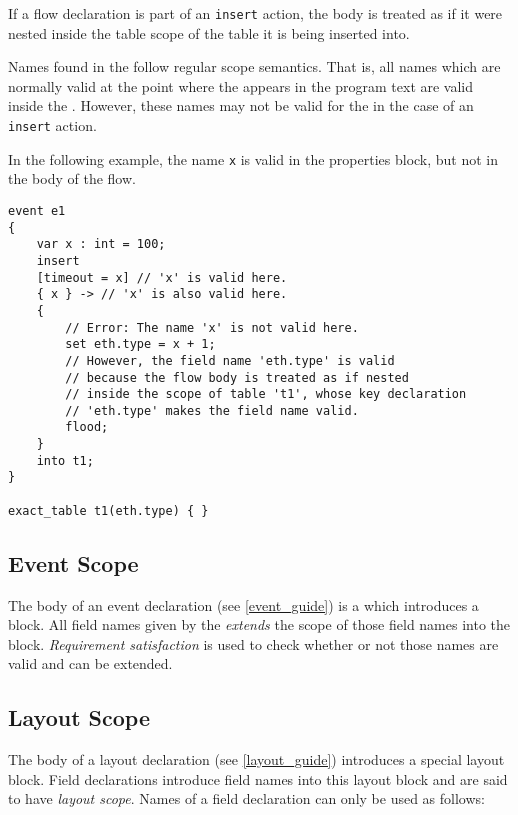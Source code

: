 If a flow declaration is part of an \texttt{insert} action, the body is treated as if it were nested inside the table scope of the table it is being inserted into. 

Names found in the  follow regular scope semantics. That is, all names which are normally valid at the point where the  appears in the program text are valid inside the . However, these names may not be valid for the  in the case of an \texttt{insert} action.

In the following example, the name \texttt{x} is valid in the properties block, but not in the body of the flow.

\noindent\begin{minipage}{\linewidth}
\begin{lstlisting}
event e1 
{
	var x : int = 100;
	insert
	[timeout = x] // 'x' is valid here.
	{ x } -> // 'x' is also valid here. 
	{
		// Error: The name 'x' is not valid here.
		set eth.type = x + 1; 
		// However, the field name 'eth.type' is valid
		// because the flow body is treated as if nested
		// inside the scope of table 't1', whose key declaration
		// 'eth.type' makes the field name valid.
		flood; 
	}
	into t1;
}

exact_table t1(eth.type) { }
\end{lstlisting}
\end{minipage}

\subsection{Event Scope} \label{event_scope}

The body of an event declaration (see \ref{event_guide}) is a  which introduces a block. All field names given by the  \textit{extends} the scope of those field names into the block. \textit{Requirement satisfaction} is used to check whether or not those names are valid and can be extended.

\subsection{Layout Scope} \label{layout_scope}

The body of a layout declaration (see \ref{layout_guide}) introduces a special layout block. Field declarations introduce field names into this layout block and are said to have \textit{layout scope}. Names of a field declaration can only be used as follows:

